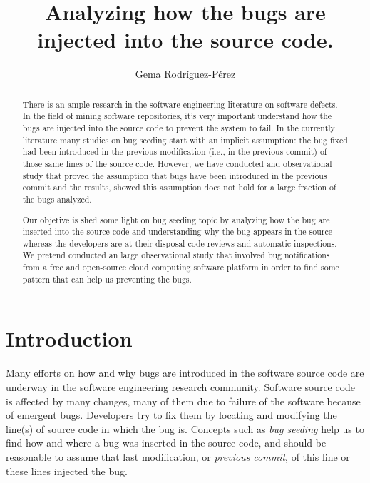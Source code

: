 \documentclass[ifip]{svmult}
\begin{document}
\title*{Analyzing how the bugs are injected into the source code.}
\author{Gema Rodr\'iguez-P\'erez}
%
%
\maketitle

\begin{abstract}
There is an ample research in the software engineering literature on software defects. In the field of mining software repositories, it's very important understand how the bugs are injected into the source code to prevent the system to fail. In the currently literature many studies on bug seeding start with an implicit assumption: the bug fixed had been introduced in the previous modification (i.e., in the previous commit) of those same lines of the source code. However, we have conducted and observational study that proved the assumption that bugs have been introduced in the previous commit and the results, showed this assumption does not hold for a large fraction of the bugs analyzed.

Our objetive is shed some light on bug seeding topic by analyzing how the bug are inserted into the source code and understanding why the bug appears in the source whereas the developers are at their disposal code reviews and automatic inspections. We pretend conducted an large observational study that involved bug notifications from a free and open-source cloud computing software platform in order to find some pattern that can help us preventing the bugs. 
\end{abstract}


\section{Introduction}
\label{sec:1}

Many efforts on how and why bugs are introduced in the software source code are underway in the software engineering research community. Software source code is affected by many changes, many of them due to failure of the software because of emergent bugs. Developers try to fix them by locating and modifying the line(s) of source code in which the bug is. Concepts such as \emph{bug seeding} help us to find how and where a bug was inserted in the source code, and should be reasonable to assume that last modification, or \textit{previous commit}, of this line or these lines injected the bug.
\end{document}
